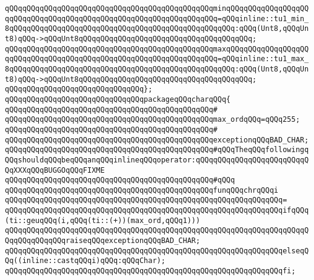 \verb|qQQqqQQqqQQqqQQqqQQqqQQqqQQqqQQqqQQqqQQqqQQqqQQqminqQQqqQQqqQQqqQQqqQQqqQQqqQQqqQQqqQQqqQQqqQQqqQQqqQQqqQQqqQQqqQQqqQQq=qQQqinline::tu1_min_8qQQqqQQqqQQqqQQqqQQqqQQqqQQqqQQqqQQqqQQqqQQqqQQqqQQq:qQQq(Unt8,qQQqUnt8)qQQq->qQQqUnt8qQQqqQQqqQQqqQQqqQQqqQQqqQQqqQQqqQQqqQQq;|\newline
\verb|qQQqqQQqqQQqqQQqqQQqqQQqqQQqqQQqqQQqqQQqqQQqqQQqmaxqQQqqQQqqQQqqQQqqQQqqQQqqQQqqQQqqQQqqQQqqQQqqQQqqQQqqQQqqQQqqQQqqQQq=qQQqinline::tu1_max_8qQQqqQQqqQQqqQQqqQQqqQQqqQQqqQQqqQQqqQQqqQQqqQQqqQQq:qQQq(Unt8,qQQqUnt8)qQQq->qQQqUnt8qQQqqQQqqQQqqQQqqQQqqQQqqQQqqQQqqQQqqQQq;|\newline
\verb|qQQqqQQqqQQqqQQqqQQqqQQqqQQqqQQq};|\newline
\newline
\verb|qQQqqQQqqQQqqQQqqQQqqQQqqQQqqQQqpackageqQQqcharqQQq{|\newline
\verb|qQQqqQQqqQQqqQQqqQQqqQQqqQQqqQQqqQQqqQQqqQQqqQQq#|\newline
\verb|qQQqqQQqqQQqqQQqqQQqqQQqqQQqqQQqqQQqqQQqqQQqqQQqmax_ordqQQq=qQQq255;|\newline
\verb|qQQqqQQqqQQqqQQqqQQqqQQqqQQqqQQqqQQqqQQqqQQqqQQq#|\newline
\verb|qQQqqQQqqQQqqQQqqQQqqQQqqQQqqQQqqQQqqQQqqQQqqQQqexceptionqQQqBAD_CHAR;|\newline
\newline
\verb|qQQqqQQqqQQqqQQqqQQqqQQqqQQqqQQqqQQqqQQqqQQqqQQq#qQQqTheqQQqfollowingqQQqshouldqQQqbeqQQqanqQQqinlineqQQqoperator:qQQqqQQqqQQqqQQqqQQqqQQqqQQqXXXqQQqBUGGOqQQqFIXME|\newline
\verb|qQQqqQQqqQQqqQQqqQQqqQQqqQQqqQQqqQQqqQQqqQQqqQQq#qQQq|\newline
\verb|qQQqqQQqqQQqqQQqqQQqqQQqqQQqqQQqqQQqqQQqqQQqqQQqfunqQQqchrqQQqi|\newline
\verb|qQQqqQQqqQQqqQQqqQQqqQQqqQQqqQQqqQQqqQQqqQQqqQQqqQQqqQQqqQQqqQQq=|\newline
\verb|qQQqqQQqqQQqqQQqqQQqqQQqqQQqqQQqqQQqqQQqqQQqqQQqqQQqqQQqqQQqqQQqifqQQq(ti::geuqQQq(i,qQQq(ti::(+))(max_ord,qQQq1)))|\newline
\verb|qQQqqQQqqQQqqQQqqQQqqQQqqQQqqQQqqQQqqQQqqQQqqQQqqQQqqQQqqQQqqQQqqQQqqQQqqQQqqQQqqQQqraiseqQQqexceptionqQQqBAD_CHAR;|\newline
\verb|qQQqqQQqqQQqqQQqqQQqqQQqqQQqqQQqqQQqqQQqqQQqqQQqqQQqqQQqqQQqqQQqelseqQQq((inline::castqQQqi)qQQq:qQQqChar);|\newline
\verb|qQQqqQQqqQQqqQQqqQQqqQQqqQQqqQQqqQQqqQQqqQQqqQQqqQQqqQQqqQQqqQQqfi;|\newline
